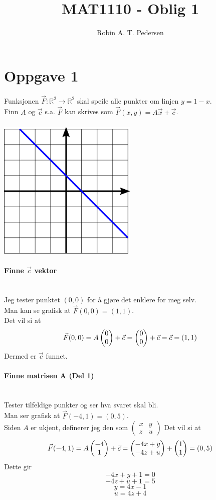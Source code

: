 \documentclass{article}
\newcommand*\colvec[3][]{
    \begin{pmatrix}\ifx\relax#1\relax\else#1\\\fi#2\\#3\end{pmatrix}
}
\begin{document}
\title{MAT1110 - Oblig 1}
\author{Robin A. T. Pedersen}
\maketitle

\section{Oppgave 1}
Funksjonen $\vec{F}: \mathbb{R}^2 \to \mathbb{R}^2$
skal speile alle punkter om linjen $y = 1 - x$.\\
Finn $A$ og $\vec{c}$ s.a. $\vec{F}$ kan skrives som
$\vec{F}(x,y) = A\vec{x} + \vec{c}$.\\\\
\includegraphics[width=0.5\textwidth]{./mat1110-oblig1-oppg1.png}

\paragraph{Finne $\vec{c}$ vektor} \mbox{} \\
Jeg tester punktet $(0,0)$ for å gjøre det enklere for meg selv.\\
Man kan se grafisk at
$\vec{F}(0,0) = (1,1)$.\\
Det vil si at
$$\vec{F}(0,0) = A\colvec{0}{0}+\vec{c}
= \colvec{0}{0}+\vec{c} = \vec{c} = (1,1)$$
Dermed er $\vec{c}$ funnet.

\paragraph{Finne matrisen A (Del 1)} \mbox{} \\
Tester tilfeldige punkter og ser hva svaret skal bli.\\
Man ser grafisk at
$\vec{F}(-4,1) = (0,5)$.\\
Siden $A$ er ukjent, definerer jeg den som
$\left( \begin{matrix}
  x & y \\
  z & u
\end{matrix} \right)$
Det vil si at
$$\vec{F}(-4,1) = A\colvec{-4}{1}+\vec{c}
= \colvec{-4x+y}{-4z+u} + \colvec{1}{1} = (0,5)$$
Dette gir
$$-4x + y + 1 = 0 $$
$$-4z + u + 1 = 5$$
$$y = 4x - 1$$
$$u = 4z + 4$$
\end{document}
